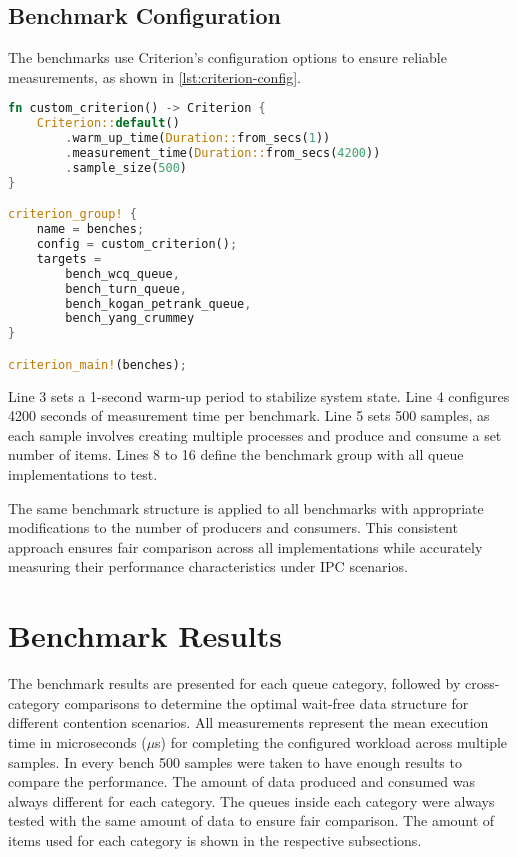 \subsection{Benchmark Configuration}
The benchmarks use Criterion's configuration options to ensure reliable measurements, as shown in \cref{lst:criterion-config}.

\begin{lstlisting}[language=Rust, style=boxed, caption={Criterion benchmark configuration}, label={lst:criterion-config}]
fn custom_criterion() -> Criterion {
    Criterion::default()
        .warm_up_time(Duration::from_secs(1))
        .measurement_time(Duration::from_secs(4200))
        .sample_size(500)
}

criterion_group! {
    name = benches;
    config = custom_criterion();
    targets =
        bench_wcq_queue,
        bench_turn_queue,
        bench_kogan_petrank_queue,
        bench_yang_crummey
}

criterion_main!(benches);
\end{lstlisting}

Line 3 sets a 1-second warm-up period to stabilize system state. Line 4 configures 4200 seconds of measurement time per benchmark. Line 5 sets 500 samples, as each sample involves creating multiple processes and produce and consume a set number of items. Lines 8 to 16 define the benchmark group with all queue implementations to test.

The same benchmark structure is applied to all benchmarks with appropriate modifications to the number of producers and consumers. This consistent approach ensures fair comparison across all implementations while accurately measuring their performance characteristics under \ac{IPC} scenarios.

\section{Benchmark Results}
The benchmark results are presented for each queue category, followed by cross-category comparisons to determine the optimal wait-free data structure for different contention scenarios. All measurements represent the mean execution time in microseconds ($\mu$s) for completing the configured workload across multiple samples. In every bench 500 samples were taken to have enough results to compare the performance. The amount of data produced and consumed was always different for each category. The queues inside each category were always tested with the same amount of data to ensure fair comparison. The amount of items used for each category is shown in the respective subsections.

